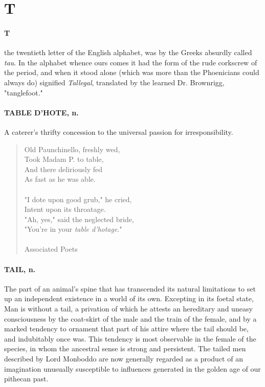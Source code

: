 \documentclass[11pt]{article}
\begin{document}
\section*{T}



\paragraph{T} the twentieth letter of the English alphabet, was by the Greeks
absurdly called {\em tau}.  In the alphabet whence ours comes it had the
form of the rude corkscrew of the period, and when it stood alone
(which was more than the Phoenicians could always do) signified
{\em Tallegal}, translated by the learned Dr. Brownrigg, "tanglefoot."

\paragraph{TABLE D'HOTE, n.}  A caterer's thrifty concession to the universal
passion for irresponsibility.

\begin{quote}   Old Paunchinello, freshly wed, \\
      Took Madam P. to table, \\
  And there deliriously fed \\
      As fast as he was able. \\
 \\
  "I dote upon good grub," he cried, \\
      Intent upon its throatage. \\
  "Ah, yes," said the neglected bride, \\
      "You're in your {\em table d'hotage}." \\
 \\
Associated Poets \end{quote}


\paragraph{TAIL, n.}  The part of an animal's spine that has transcended its
natural limitations to set up an independent existence in a world of
its own.  Excepting in its foetal state, Man is without a tail, a
privation of which he attests an hereditary and uneasy consciousness
by the coat-skirt of the male and the train of the female, and by a
marked tendency to ornament that part of his attire where the tail
should be, and indubitably once was.  This tendency is most observable
in the female of the species, in whom the ancestral sense is strong
and persistent.  The tailed men described by Lord Monboddo are now
generally regarded as a product of an imagination unusually
susceptible to influences generated in the golden age of our pithecan
past.
\end{document}
